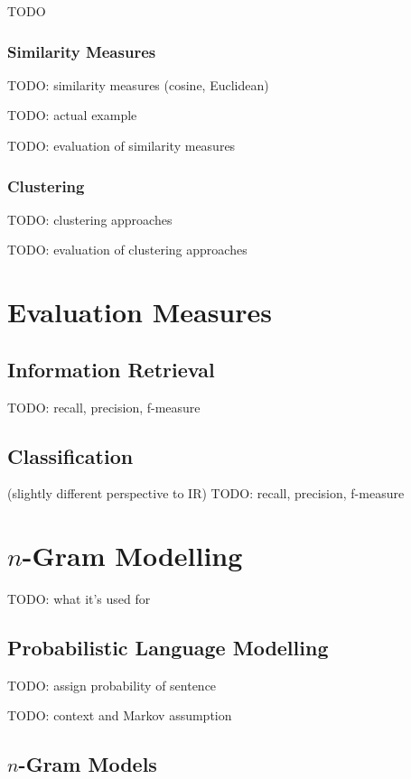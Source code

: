 \documentclass{article}
\begin{document}
TODO

\subsubsection{Similarity Measures}

TODO: similarity measures (cosine, Euclidean)

TODO: actual example

TODO: evaluation of similarity measures

\subsubsection{Clustering}

TODO: clustering approaches

TODO: evaluation of clustering approaches

\section{Evaluation Measures}

\subsection{Information Retrieval}

TODO: recall, precision, f-measure

\subsection{Classification}

(slightly different perspective to IR)
TODO: recall, precision, f-measure


\section{$n$-Gram Modelling}

TODO: what it's used for

\subsection{Probabilistic Language Modelling}

TODO: assign probability of sentence

TODO: context and Markov assumption

\subsection{$n$-Gram Models}
\end{document}
